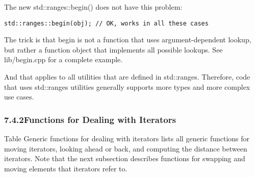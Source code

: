 The new std::ranges::begin() does not have this problem:

\begin{lstlisting}[style=styleCXX]
std::ranges::begin(obj); // OK, works in all these cases
\end{lstlisting}

The trick is that begin is not a function that uses argument-dependent lookup, but rather a function object that implements all possible lookups. See lib/begin.cpp for a complete example.

And that applies to all utilities that are defined in std::ranges. Therefore, code that uses std::ranges utilities generally supports more types and more complex use cases.


\subsubsection*{ 7.4.2\hspace{0.2cm}Functions for Dealing with Iterators}

Table Generic functions for dealing with iterators lists all generic functions for moving iterators, looking ahead or back, and computing the distance between iterators. Note that the next subsection describes functions for swapping and moving elements that iterators refer to.


